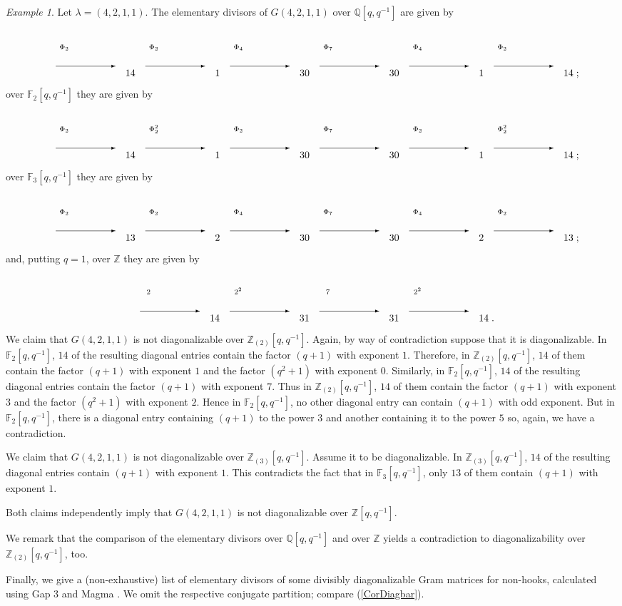 \documentclass[twoside]{amsart}
\newcommand{\lraa}[1]{\begin{picture}(80,50)      %
                      \put(  10,  10){\vector(1,0){60}}
                      \put(  10,  27){\makebox[6mm]{$\scriptstyle #1$}}
                      \end{picture} }
\numberwithin{equation}{section}
\theoremstyle{remark}
\newtheorem{Example}[equation]{Example}
\def\F{{\mathbb F}}
\def\Z{{\mathbb Z}}
\def\Q{{\mathbb Q}}
\begin{document}
\begin{Example}
\rm
Let $\lambda = (4,2,1,1)$. The elementary divisors of $G(4,2,1,1)$ over $\Q[q,q^{-1}]$ are given by
\[
\lraa{\Phi_2} 14\lraa{\Phi_2} 1 \lraa{\Phi_4} 30\lraa{\Phi_7} 30\lraa{\Phi_4} 1 \lraa{\Phi_2} 14\; ;
\]
over $\F_2[q,q^{-1}]$ they are given by
\[
\lraa{\Phi_2} 14\lraa{\Phi_2^2} 1 \lraa{\Phi_2} 30\lraa{\Phi_7} 30\lraa{\Phi_2} 1 \lraa{\Phi_2^2} 14\; ;
\]
over $\F_3[q,q^{-1}]$ they are given by
\[
\lraa{\Phi_2} 13\lraa{\Phi_2} 2 \lraa{\Phi_4} 30\lraa{\Phi_7} 30\lraa{\Phi_4} 2 \lraa{\Phi_2} 13\; ;
\]
and, putting $q = 1$, over $\Z$ they are given by
\[
\lraa{2} 14\lraa{2^2} 31 \lraa{7} 31\lraa{2^2} 14\; .
\]
We claim that $G(4,2,1,1)$ is not diagonalizable over
$\Z_{(2)}[q,q^{-1}]$. Again, by way of contradiction suppose that it
is diagonalizable. In $\F_2[q,q^{-1}]$, $14$ of the resulting diagonal
entries contain the factor $(q+1)$ with exponent $1$. Therefore, in
$\Z_{(2)}[q,q^{-1}]$, $14$ of them contain the factor $(q+1)$ with
exponent $1$ and the factor $(q^2 + 1)$ with exponent $0$. Similarly,
in $\F_2[q,q^{-1}]$, $14$ of the resulting diagonal entries contain
the factor $(q+1)$ with exponent $7$. Thus in $\Z_{(2)}[q,q^{-1}]$,
$14$ of them contain the factor $(q+1)$ with exponent $3$ and the
factor $(q^2 + 1)$ with exponent $2$. Hence in $\F_2[q,q^{-1}]$, no
other diagonal entry can contain $(q+1)$ with odd exponent. But in
$\F_2[q,q^{-1}]$, there is a diagonal entry containing $(q+1)$ to the
power $3$ and another containing it to the power $5$ so, again, we have a
contradiction.

We claim that $G(4,2,1,1)$ is not diagonalizable over $\Z_{(3)}[q,q^{-1}]$. Assume it to be diagonalizable. In $\Z_{(3)}[q,q^{-1}]$, $14$ of the resulting
diagonal entries contain $(q+1)$ with exponent $1$. This contradicts the fact that in $\F_3[q,q^{-1}]$, only $13$ of them contain $(q+1)$ with 
exponent $1$.

Both claims independently imply that $G(4,2,1,1)$ is not diagonalizable over $\Z[q,q^{-1}]$.

We remark that the comparison of the elementary divisors over $\Q[q,q^{-1}]$ and over 
$\Z$ yields a contradiction to diagonalizability over $\Z_{(2)}[q,q^{-1}]$, too.
\end{Example}

Finally, we give a (non-exhaustive) list of elementary divisors of
some divisibly diagonalizable Gram matrices for non-hooks, calculated
using {\sc Gap 3} \cite{Gap} and {\sc Magma} \cite{Magma}. We omit the
respective conjugate partition; compare (\ref{CorDiagbar}).
\end{document}
